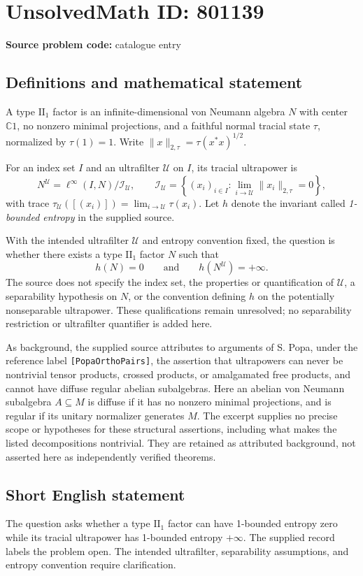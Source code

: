 \documentclass[11pt]{article}
\newcommand{\C}{\mathbb{C}}
\begin{document}
\section*{UnsolvedMath ID: 801139}
\textbf{Source problem code:} catalogue entry
\subsection{Definitions and mathematical statement}
A type \(\mathrm{II}_1\) factor is an infinite-dimensional von Neumann algebra \(N\) with center \(\C 1\), no nonzero minimal projections, and a faithful normal tracial state \(\tau\), normalized by \(\tau(1)=1\). Write \(\|x\|_{2,\tau}=\tau(x^*x)^{1/2}\).

For an index set \(I\) and an ultrafilter \(\mathcal U\) on \(I\), its tracial ultrapower is
\[
N^{\mathcal U}=\ell^\infty(I,N)\big/\mathcal I_{\mathcal U},\qquad
\mathcal I_{\mathcal U}=\left\{(x_i)_{i\in I}:\lim_{i\to\mathcal U}\|x_i\|_{2,\tau}=0\right\},
\]
with trace \(\tau_{\mathcal U}([(x_i)])=\lim_{i\to\mathcal U}\tau(x_i)\). Let \(h\) denote the invariant called \emph{1-bounded entropy} in the supplied source.

With the intended ultrafilter \(\mathcal U\) and entropy convention fixed, the question is whether there exists a type \(\mathrm{II}_1\) factor \(N\) such that
\[
 h(N)=0\qquad\text{and}\qquad h(N^{\mathcal U})=+\infty.
\]
The source does not specify the index set, the properties or quantification of \(\mathcal U\), a separability hypothesis on \(N\), or the convention defining \(h\) on the potentially nonseparable ultrapower. These qualifications remain unresolved; no separability restriction or ultrafilter quantifier is added here.

As background, the supplied source attributes to arguments of S. Popa, under the reference label \texttt{[PopaOrthoPairs]}, the assertion that ultrapowers can never be nontrivial tensor products, crossed products, or amalgamated free products, and cannot have diffuse regular abelian subalgebras. Here an abelian von Neumann subalgebra \(A\subseteq M\) is diffuse if it has no nonzero minimal projections, and is regular if its unitary normalizer generates \(M\). The excerpt supplies no precise scope or hypotheses for these structural assertions, including what makes the listed decompositions nontrivial. They are retained as attributed background, not asserted here as independently verified theorems.
\subsection{Short English statement}
The question asks whether a type \(\mathrm{II}_1\) factor can have 1-bounded entropy zero while its tracial ultrapower has 1-bounded entropy \(+\infty\). The supplied record labels the problem open. The intended ultrafilter, separability assumptions, and entropy convention require clarification.
\end{document}

